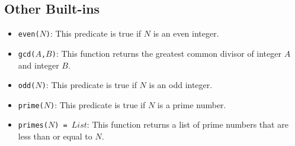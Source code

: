 \subsection{Other Built-ins}
\begin{itemize}
\item \texttt{even($N$)}: This predicate is true if $N$ is an even integer.
\item \texttt{gcd($A$,$B$)}: This function returns the greatest common divisor of integer $A$ and integer $B$.
\item \texttt{odd($N$)}: This predicate is true if $N$ is an odd integer.
\item \texttt{prime($N$)}: This predicate is true if $N$ is a prime number.
\item \texttt{primes($N$) = $List$}: This function returns a list of prime numbers that are less than or equal to $N$.
\end{itemize}


\ignore{

}
